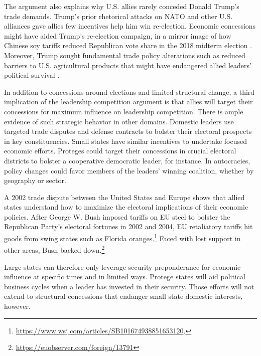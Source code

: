 \documentclass[12pt]{article}
\begin{document}
The argument also explains why U.S. allies rarely conceded Donald Trump's trade demands. 
Trump's prior rhetorical attacks on NATO and other U.S. alliances gave allies few incentives help him win re-election. 
Economic concessions might have aided Trump's re-election campaign, in a mirror image of how Chinese soy tariffs reduced Republican vote share in the 2018 midterm election \citep{ChyzhUrbatsch2021}. 
Moreover, Trump sought fundamental trade policy alterations such as reduced barriers to U.S. agricultural products that might have endangered allied leaders' political survival \citep{HeeParkJensen2007}.


In addition to concessions around elections and limited structural change, a third implication of the leadership competition argument is that allies will target their concessions for maximum influence on leadership competition. 
There is ample evidence of such strategic behavior in other domains.
Domestic leaders use targeted trade disputes \citep{Conconietal2017} and defense contracts \citep{DerouenHeo2000} to bolster their electoral prospects in key constituencies.  
Small states have similar incentives to undertake focused economic efforts.
Proteges could target their concessions in crucial electoral districts to bolster a cooperative democratic leader, for instance. 
In autocracies, policy changes could favor members of the leaders' winning coalition, whether by geography or sector.


A 2002 trade dispute between the United States and Europe shows that allied states understand how to maximize the electoral implications of their economic policies. 
After George W. Bush imposed tariffs on EU steel to bolster the Republican Party's electoral fortunes in 2002 and 2004, EU retaliatory tariffs hit goods from swing states such as Florida oranges.\footnote{\url{https://www.wsj.com/articles/SB101674938851653120}.}
Faced with lost support in other areas, Bush backed down.\footnote{\url{https://euobserver.com/foreign/13791}}


Large states can therefore only leverage security preponderance for economic influence at specific times and in limited ways.
Protege states will aid political business cycles when a leader has invested in their security. 
Those efforts will not extend to structural concessions that endanger small state domestic interests, however.
\end{document}
